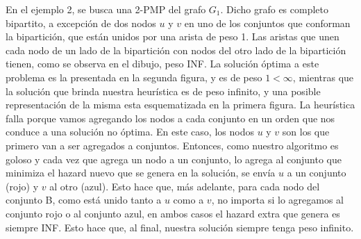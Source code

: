 \documentclass[11pt, a4paper, twoside]{article}
\begin{document}
\begin{enumerate}
		
		En el ejemplo 2, se busca una 2-PMP del grafo $G_{1}$.  Dicho grafo es completo bipartito,
		a excepción de dos nodos $u$ y $v$ en uno de los conjuntos que conforman la bipartición, que están unidos por una
		arista de peso 1. Las aristas que unen cada nodo de un lado de la bipartición con nodos del otro lado de la 
		bipartición tienen, como se observa en el dibujo, peso INF. 
		La solución óptima a este problema es la presentada en la segunda
		figura, y es de peso $1 < \infty$, mientras que la solución que brinda nuestra heurística es de peso
		infinito, y una posible representación de la misma esta esquematizada en la primera figura. 
		La heurística falla
		porque vamos agregando los nodos a cada conjunto en un orden que nos conduce a una solución no óptima. En este caso,
		los nodos $u$ y $v$ son los que primero van a ser agregados a conjuntos. Entonces, como nuestro algoritmo
		es goloso y cada vez que agrega un nodo a un conjunto, lo agrega al conjunto que minimiza el hazard nuevo que se
		genera en la solución, se envía $u$ a un conjunto (rojo) y $v$ al otro (azul). Esto hace que, más adelante, para 
		cada nodo del conjunto B, como está unido tanto a $u$ como a $v$, 
		no importa si lo agregamos al conjunto rojo o al conjunto azul, en ambos casos el hazard extra que genera
	    es siempre INF. Esto hace que, al final, nuestra solución siempre tenga peso infinito. \\
	    

\end{enumerate}
\end{document}

